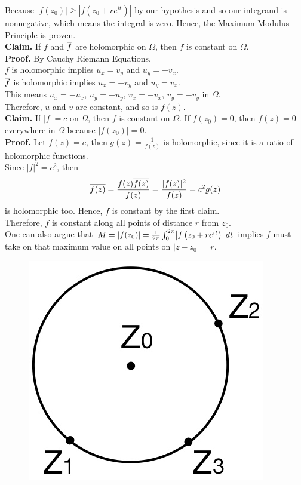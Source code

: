 \documentclass[11pt]{article}
\DeclarePairedDelimiter\abs{\lvert}{\rvert}
\begin{document}
Because $ |f(z_0)| \geqslant |f\left(z_0 + re^{it}\right)| $ by our hypothesis and so our integrand is nonnegative, which means the integral is zero. Hence, the Maximum Modulus Principle is proven. \\
\newline
\textbf{Claim.} If $f$ and $\overline{f}$ are holomorphic on $\Omega$, then $f$ is constant on $\Omega$. \\
\textbf{Proof.} By Cauchy Riemann Equations, \\
$f$ is holomorphic implies $u_x = v_y$ and $u_y = -v_x$. \\
$\overline{f}$ is holomorphic implies $u_x = -v_y$ and $u_y = v_x$. \\
This means $u_x = -u_x$, $u_y = -u_y$, $v_x = -v_x$, $v_y = -v_y$ in $\Omega$. \\
Therefore, $u$ and $v$ are constant, and so is $f(z)$. \\
\newpage
\textbf{Claim.} If $|f| = c$ on $\Omega$, then $f$ is constant on $\Omega$. If $f(z_0) = 0$, then $f(z) = 0$ everywhere in $\Omega$ because $|f(z_0)| = 0$. \\
\textbf{Proof.} Let $f(z) = c$, then $g(z) = \frac{1}{f(z)}$ is holomorphic, since it is a ratio of holomorphic functions. \\
Since $|f|^2 = c^2$, then 
$$\overline{f(z)} = \frac{f(z)\overline{f(z)}}{f(z)} = \frac{|f(z)|^2}{f(z)} = c^2g(z)$$ 
is holomorphic too. Hence, $f$ is constant by the first claim. \\
Therefore, $f$ is constant along all points of distance $r$ from $z_0$. \\
\newline
One can also argue that $M = |f(z_0)| = \frac{1}{2\pi}\int_0^{2\pi}\abs*{f\left(z_0 + re^{it}\right)}\, dt$ implies $f$ must take on that maximum value on all points on $|z - z_0| = r$.
\begin{figure}[H]
\includegraphics[scale = 0.2]{14_1}
\centering
\end{figure} 
\end{document}

